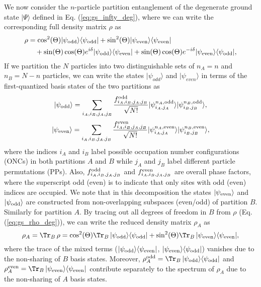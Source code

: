 We now consider the $n$-particle partition entanglement of the degenerate ground
state $\vert\Psi\rangle$ defined in Eq. (\ref{eq:gs_infty_deg}), where we can
write the corresponding full density matrix $\rho$ as 
\begin{eqnarray}
\rho &=\cos^2(\Theta)\vert\psi_{\rm{odd}}\rangle\langle\psi_{\rm{odd}}\vert+\sin^2(\Theta)\vert\psi_{\rm{even}}\rangle\langle\psi_{\rm{even}}\vert\nonumber\\
&\quad+\sin(\Theta)\cos(\Theta)e^{i\delta}\vert\psi_{\rm{odd}}\rangle\langle\psi_{\rm{even}}\vert+\sin(\Theta)\cos(\Theta)e^{-i\delta}\vert\psi_{\rm{even}}\rangle\langle\psi_{\rm{odd}}\vert,
\label{eq:gs_rho_deg}
\end{eqnarray}
If we partition the $N$ particles into two distinguishable sets 
of $n_A=n$ and $n_B=N-n$ particles, we can write the states $\vert
\psi_{odd}\rangle$ and $\vert \psi_{even}\rangle$ in terms of the
first-quantized basis states of the two partitions as
%
\begin{equation}
\vert \psi_{\rm{odd}}\rangle=\sum_{i_A,i_B,j_A,j_B} \frac{f_{i_A,i_B,j_A,j_B}^{\rm{odd}}}{\sqrt{N!}}\vert \psi^{n_A,\rm{odd}}_{i_A,j_A}\rangle\vert \psi^{n_B,\rm{odd}}_{i_B,j_B}\rangle
\label{Psi_odd_AB},
\end{equation}
%
\begin{equation}
\vert \psi_{\rm{even}}\rangle=\sum_{i_A,i_B,j_A,j_B} \frac{f_{i_A,i_B,j_A,j_B}^{\rm{even}}}{\sqrt{N!}}\vert \psi^{n_A,\rm{even}}_{i_A,j_A}\rangle\vert \psi^{n_B,\rm{even}}_{i_B,j_B}\rangle
\label{Psi_even_AB},
\end{equation}
%
where the indices $i_A$ and $i_B$ label possible  occupation number
configurations (ONCs) in both partitions $A$ and $B$ while $j_A$ and $j_B$
label different particle permutations (PPs). Also, $f_{i_A,i_B,j_A,j_B}^{\rm{odd}}$ and
$f_{i_A,i_B,j_A,j_B}^{\rm{even}}$ are overall phase factors, where the
superscript odd (even) is to indicate that only sites with odd (even) indices
are occupied.  We note that in this decomposition  the states
$\vert\psi_{\rm{even}}\rangle$ and $\vert \psi_{\rm{odd}}\rangle$ 
are constructed from non-overlapping subspaces (even/odd) of partition $B$.
Similarly for partition $A$.
By tracing out all degrees of freedom in $B$ from $\rho$ (Eq.
(\ref{eq:gs_rho_deg})), we can write the reduced density matrix $\rho_A$ as
%
\begin{equation}
    \rho_A = {\Tr}_{B}\,\rho= \cos^2(\Theta){\Tr}_{B}\,\vert\psi_{\rm{odd}}\rangle\langle\psi_{\rm{odd}}\vert+\sin^2(\Theta) {\Tr}_{B}\, \vert\psi_{\rm{even}}\rangle\langle\psi_{\rm{even}}\vert,
\label{eq:rho_A_final}
\end{equation}
%
where the trace of the mixed terms
($\vert\psi_{\rm{odd}}\rangle\langle\psi_{\rm{even}}\vert$,
$\vert\psi_{\rm{even}}\rangle\langle\psi_{\rm{odd}}\vert$) vanishes due to the
non-sharing of $B$ basis states.  Moreover, 
$\rho_A^{\rm odd}={\Tr}_{B}\,\vert\psi_{\rm{odd}}\rangle\langle\psi_{\rm{odd}}\vert$
and $\rho_A^{\rm even}={\Tr}_{B}\,
\vert\psi_{\rm{even}}\rangle\langle\psi_{\rm{even}}\vert$ contribute separately
to the spectrum of $\rho_A$ due to the non-sharing of $A$ basis states.

